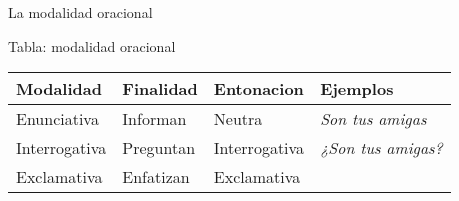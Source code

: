 \documentclass[ignorenonframetext,]{beamer}
\begin{document}
\begin{frame}{La modalidad oracional}
\begin{block}{Tabla: modalidad oracional}
\begin{longtable}[]{@{}llll@{}}
\toprule
\begin{minipage}[b]{0.15\columnwidth}\raggedright
\textbf{Modalidad}\strut
\end{minipage} & \begin{minipage}[b]{0.14\columnwidth}\raggedright
\textbf{Finalidad}\strut
\end{minipage} & \begin{minipage}[b]{0.18\columnwidth}\raggedright
\textbf{Entonacion}\strut
\end{minipage} & \begin{minipage}[b]{0.41\columnwidth}\raggedright
\textbf{Ejemplos}\strut
\end{minipage}\tabularnewline
\midrule
\endhead
\begin{minipage}[t]{0.15\columnwidth}\raggedright
Enunciativa\strut
\end{minipage} & \begin{minipage}[t]{0.14\columnwidth}\raggedright
Informan\strut
\end{minipage} & \begin{minipage}[t]{0.18\columnwidth}\raggedright
Neutra\strut
\end{minipage} & \begin{minipage}[t]{0.41\columnwidth}\raggedright
\emph{Son tus amigas}\strut
\end{minipage}\tabularnewline
\begin{minipage}[t]{0.15\columnwidth}\raggedright
Interrogativa\strut
\end{minipage} & \begin{minipage}[t]{0.14\columnwidth}\raggedright
Preguntan\strut
\end{minipage} & \begin{minipage}[t]{0.18\columnwidth}\raggedright
Interrogativa\strut
\end{minipage} & \begin{minipage}[t]{0.41\columnwidth}\raggedright
\emph{¿Son tus amigas?}\strut
\end{minipage}\tabularnewline
\begin{minipage}[t]{0.15\columnwidth}\raggedright
Exclamativa\strut
\end{minipage} & \begin{minipage}[t]{0.14\columnwidth}\raggedright
Enfatizan\strut
\end{minipage} & \begin{minipage}[t]{0.18\columnwidth}\raggedright
Exclamativa\strut
\end{minipage} & \begin{minipage}[t]{0.41\columnwidth}\raggedright

\end{minipage}
\end{longtable}
\end{block}
\end{frame}
\end{document}

